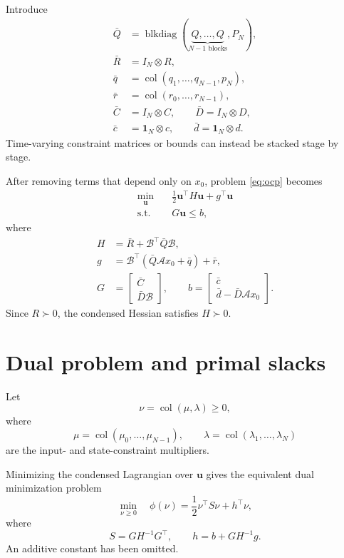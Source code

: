 \documentclass[11pt]{article}
\newcommand{\col}{\operatorname{col}}
\newcommand{\blkdiag}{\operatorname{blkdiag}}
\begin{document}
Introduce
\[
\begin{aligned}
\bar Q&=\blkdiag(
 \underbrace{Q,\ldots,Q}_{N-1\text{ blocks}},P_N),\\
\bar R&=I_N\otimes R,\\
\bar q&=\col(q_1,\ldots,q_{N-1},p_N),\\
\bar r&=\col(r_0,\ldots,r_{N-1}),\\
\bar C&=I_N\otimes C,\qquad
\bar D=I_N\otimes D,\\
\bar c&=\bm{1}_N\otimes c,\qquad
\bar d=\bm{1}_N\otimes d.
\end{aligned}
\]
Time-varying constraint matrices or bounds can instead be stacked
stage by stage.

After removing terms that depend only on \(x_0\), problem
\eqref{eq:ocp} becomes
\begin{equation}
\begin{aligned}
\min_{\bm{u}}\quad&
 \frac{1}{2}\bm{u}^\top H\bm{u}+g^\top\bm{u}\\
\text{s.t.}\quad&G\bm{u}\leq b,
\end{aligned}
\label{eq:condensed-qp}
\end{equation}
where
\begin{equation}
\begin{aligned}
H&=\bar R+\mathcal B^\top\bar Q\mathcal B,\\
g&=\mathcal B^\top(\bar Q\mathcal A x_0+\bar q)+\bar r,\\
G&=
\begin{bmatrix}
\bar C\\
\bar D\mathcal B
\end{bmatrix},
\qquad
b=
\begin{bmatrix}
\bar c\\
\bar d-\bar D\mathcal A x_0
\end{bmatrix}.
\end{aligned}
\label{eq:condensed-data}
\end{equation}
Since \(R\succ0\), the condensed Hessian satisfies \(H\succ0\).

\section{Dual problem and primal slacks}

Let
\[
\nu=\col(\mu,\lambda)\geq0,
\]
where
\[
\mu=\col(\mu_0,\ldots,\mu_{N-1}),\qquad
\lambda=\col(\lambda_1,\ldots,\lambda_N)
\]
are the input- and state-constraint multipliers.

Minimizing the condensed Lagrangian over \(\bm{u}\) gives the
equivalent dual minimization problem
\begin{equation}
\min_{\nu\geq0}
\quad
\phi(\nu)
=
\frac{1}{2}\nu^\top S\nu+h^\top\nu,
\label{eq:dual}
\end{equation}
where
\begin{equation}
S=GH^{-1}G^\top,\qquad
h=b+GH^{-1}g.
\label{eq:dual-data}
\end{equation}
An additive constant has been omitted.
\end{document}
